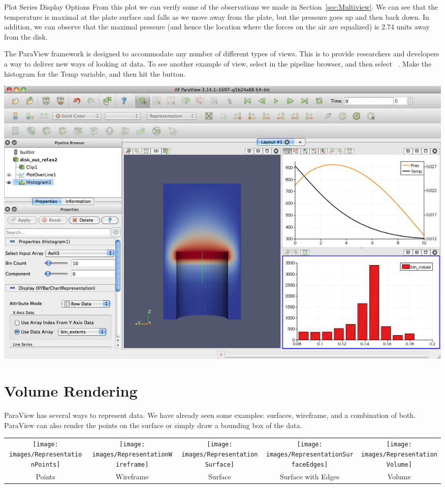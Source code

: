 \begin{exercise}{Plot Series Display Options}
  From this plot we can verify some of the observations we made in
  Section~\ref{sec:Multiview}.  We can see that the temperature is maximal
  at the plate surface and falls as we move away from the plate, but the
  pressure goes up and then back down.  In addition, we can observe that
  the maximal pressure (and hence the location where the forces on the air
  are equalized) is 2.74 units away from the disk.
\end{exercise}

The ParaView framework is designed to accommodate any number of different
types of views.  This is to provide researchers and developers a way to
deliver new ways of looking at data.  To see another example of view,
select  in the pipeline browser, and then select
 \ra {} \ra
{}~.  Make the
histogram for the Temp variable, and then hit the \apply button.

\begin{inlinefig}
  \includegraphics[width=\scw]{images/HistogramPlot}
\end{inlinefig}


\section{Volume Rendering}

ParaView has several ways to represent data.  We have already seen some
examples: surfaces, wireframe, and a combination of both.  ParaView can
also render the points on the surface or simply draw a bounding box of the
data.

\begin{inlinefig}
  \begin{tabular}{c@{\;}c@{\;}c@{\;}c@{\;}c}
    \texttt{[image: images/RepresentationPoints]} &
    \texttt{[image: images/RepresentationWireframe]} &
    \texttt{[image: images/RepresentationSurface]} &
    \texttt{[image: images/RepresentationSurfaceEdges]} &
    \texttt{[image: images/RepresentationVolume]}
    \\
    Points &
    Wireframe &
    Surface &
    \parbox[t]{.18\linewidth}{\centering{}Surface with Edges} &
    Volume
  \end{tabular}
\end{inlinefig}

